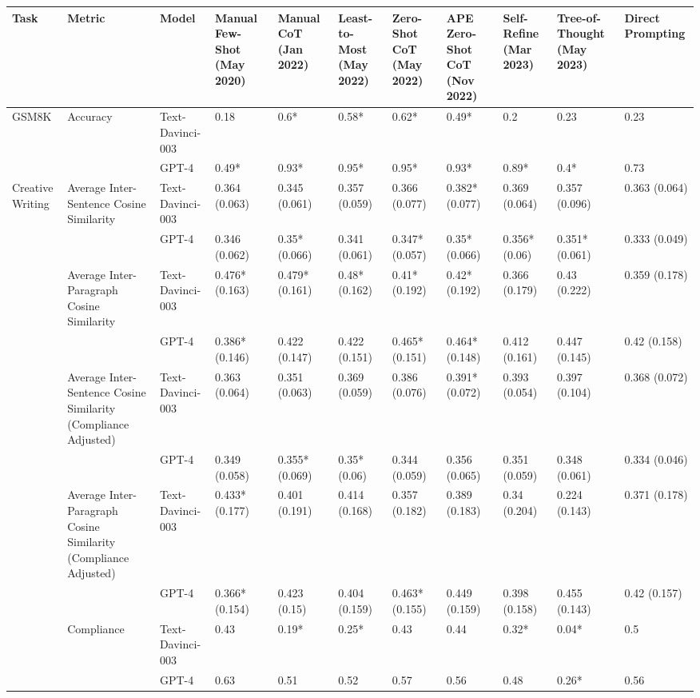 \begin{tabular}{x{0.75cm}|x{1.5cm}|x{0.75cm}|x{0.75cm}|x{0.75cm}|x{0.75cm}|x{0.75cm}|x{0.75cm}|x{0.75cm}|x{0.75cm}|x{0.75cm}}
\toprule
\hline
Task & Metric & Model & Manual Few-Shot (May 2020) & Manual CoT (Jan 2022) & Least-to-Most (May 2022) & Zero-Shot CoT (May 2022) & APE Zero-Shot CoT (Nov 2022) & Self-Refine (Mar 2023) & Tree-of-Thought (May 2023) & Direct Prompting \\
\hline
\midrule
GSM8K & Accuracy & Text-Davinci-003 & 0.18 & 0.6* & 0.58* & 0.62* & 0.49* & 0.2 & 0.23 & 0.23 \\
\hline
 &  & GPT-4 & 0.49* & 0.93* & 0.95* & 0.95* & 0.93* & 0.89* & 0.4* & 0.73 \\
\hline
Creative Writing & Average Inter-Sentence Cosine Similarity & Text-Davinci-003 & 0.364 (0.063) & 0.345 (0.061) & 0.357 (0.059) & 0.366 (0.077) & 0.382* (0.077) & 0.369 (0.064) & 0.357 (0.096) & 0.363 (0.064) \\
\hline
 &  & GPT-4 & 0.346 (0.062) & 0.35* (0.066) & 0.341 (0.061) & 0.347* (0.057) & 0.35* (0.066) & 0.356* (0.06) & 0.351* (0.061) & 0.333 (0.049) \\
\hline
 & Average Inter-Paragraph Cosine Similarity & Text-Davinci-003 & 0.476* (0.163) & 0.479* (0.161) & 0.48* (0.162) & 0.41* (0.192) & 0.42* (0.192) & 0.366 (0.179) & 0.43 (0.222) & 0.359 (0.178) \\
\hline
 &  & GPT-4 & 0.386* (0.146) & 0.422 (0.147) & 0.422 (0.151) & 0.465* (0.151) & 0.464* (0.148) & 0.412 (0.161) & 0.447 (0.145) & 0.42 (0.158) \\
\hline
 & Average Inter-Sentence Cosine Similarity (Compliance Adjusted) & Text-Davinci-003 & 0.363 (0.064) & 0.351 (0.063) & 0.369 (0.059) & 0.386 (0.076) & 0.391* (0.072) & 0.393 (0.054) & 0.397 (0.104) & 0.368 (0.072) \\
\hline
 &  & GPT-4 & 0.349 (0.058) & 0.355* (0.069) & 0.35* (0.06) & 0.344 (0.059) & 0.356 (0.065) & 0.351 (0.059) & 0.348 (0.061) & 0.334 (0.046) \\
\hline
 & Average Inter-Paragraph Cosine Similarity (Compliance Adjusted) & Text-Davinci-003 & 0.433* (0.177) & 0.401 (0.191) & 0.414 (0.168) & 0.357 (0.182) & 0.389 (0.183) & 0.34 (0.204) & 0.224 (0.143) & 0.371 (0.178) \\
\hline
 &  & GPT-4 & 0.366* (0.154) & 0.423 (0.15) & 0.404 (0.159) & 0.463* (0.155) & 0.449 (0.159) & 0.398 (0.158) & 0.455 (0.143) & 0.42 (0.157) \\
\hline
 & Compliance & Text-Davinci-003 & 0.43 & 0.19* & 0.25* & 0.43 & 0.44 & 0.32* & 0.04* & 0.5 \\
\hline
 &  & GPT-4 & 0.63 & 0.51 & 0.52 & 0.57 & 0.56 & 0.48 & 0.26* & 0.56 \\
\hline
\bottomrule
\end{tabular}
